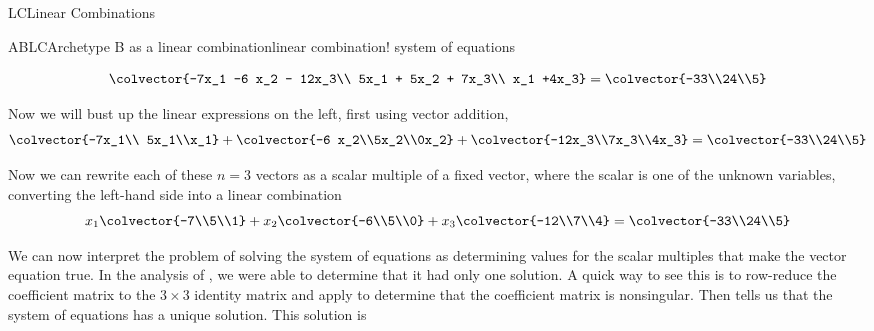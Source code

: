 \begin{subsect}{LC}{Linear Combinations}
\begin{example}{ABLC}{Archetype B as a linear combination}{linear combination! system of equations}
\begin{para}
\begin{equation*}
\colvector{-7x_1 -6 x_2 - 12x_3\\ 5x_1  + 5x_2 + 7x_3\\ x_1 +4x_3}
=
\colvector{-33\\24\\5}
\end{equation*}\end{para}
%
\begin{para}Now we will bust up the linear expressions on the left, first using vector addition,
%
\begin{equation*}
\colvector{-7x_1\\ 5x_1\\x_1}+
\colvector{-6 x_2\\5x_2\\0x_2}+
\colvector{-12x_3\\7x_3\\4x_3}
=
\colvector{-33\\24\\5}
\end{equation*}\end{para}
%
\begin{para}Now we can rewrite each of these $n=3$ vectors as a scalar multiple of a fixed vector, where the scalar is one of the unknown variables, converting the left-hand side into a linear combination
%
\begin{equation*}
x_1\colvector{-7\\5\\1}+
x_2\colvector{-6\\5\\0}+
x_3\colvector{-12\\7\\4}
=
\colvector{-33\\24\\5}
\end{equation*}\end{para}
%
\begin{para}We can now interpret the problem of solving the system of equations as determining values for the scalar multiples that make the vector equation true.  In the analysis of , we were able to determine that it had only one solution.  A quick way to see this is to row-reduce the coefficient matrix to the $3\times 3$ identity matrix and apply  to determine that the coefficient matrix is nonsingular.  Then  tells us that the system of equations has a unique solution.  This solution is
%
\begin{align*}

\end{align*}
\end{para}
\end{example}
\end{subsect}
